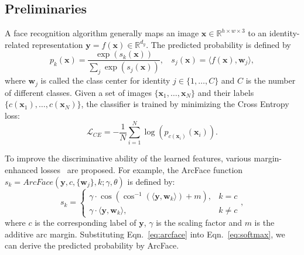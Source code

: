 \documentclass[letterpaper]{article} %
\begin{document}
\subsection{Preliminaries}
\label{ssec:preliminary}
%
A face recognition algorithm generally maps an image $\bm{x} \in \mathbb{R}^{h\times w\times 3}$ to an identity-related representation $\bm{y} = f(\bm{x}) \in \mathbb{R}^{d_y}$. %
The predicted probability is defined by
\begin{equation}
  p_k(\bm{x}) = \frac{\exp (s_k(\bm{x}))}{\sum_j \exp(s_j(\bm{x}))},~~~~s_j(\bm{x}) = \langle f(\bm{x}), \bm{w}_j\rangle,
  \label{eq:softmax}
\end{equation}
%
where $\bm{w}_j$ is called the class center for identity $j \in \{1, \dots, C\}$ and $C$ is the number of different classes.
%
Given a set of images $\{\bm{x}_1,\dots, \bm{x}_N\}$ and their labels $\{c(\bm{x}_1), \dots, c(\bm{x}_N)\}$, the classifier is trained by minimizing the Cross Entropy loss:
\begin{equation}
  \mathcal{L}_{CE} = -\frac{1}{N} \sum_{i = 1}^{N} \log \left(p_{c(\bm{x}_i)}(\bm{x}_i)\right).
  \label{eq:cross_entropy}
\end{equation}

To improve the discriminative ability of the learned features, various margin-enhanced losses~\cite{deng2019arcface,wang2018cosface} are proposed. %
%
For example, the ArcFace function $s_k = ArcFace(\bm{y}, c, \{\bm{w}_j\}, k; \gamma, \theta)$ is defined by: 
\begin{equation}
  s_k =
  \begin{cases}
    \gamma \cdot \cos( \cos^{-1}( \langle \bm{y}, \bm{w}_k \rangle) + m), & k = c\\
    \gamma \cdot \langle \bm{y}, \bm{w}_k \rangle, & k \neq c
  \end{cases},
  \label{eq:arcface}
\end{equation}
where $c$ is the corresponding label of $\bm{y}$, $\gamma$ is the scaling factor and $m$ is the additive arc margin. 
%
Substituting Eqn.~\ref{eq:arcface} into Eqn.~\ref{eq:softmax}, we can derive the predicted probability by ArcFace.
%
\end{document}
